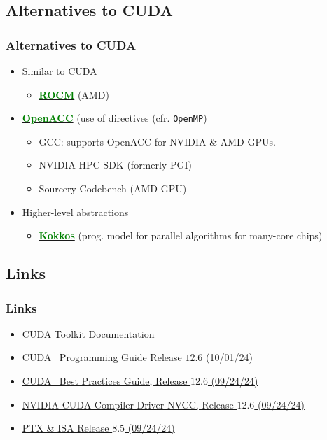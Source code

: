 \subsection{Alternatives to CUDA}
\begin{frame}
   \frametitle{Alternatives to CUDA}
      \begin{itemize}
         \item Similar to CUDA
   	    \begin{itemize}
	       \item \href{https://www.amd.com/en/products/software/rocm.html}{\textbf{\textcolor{green}{ROCM}}} (AMD)
  	    \end{itemize} 
          \item \href{https://www.openacc.org/}{\textbf{\textcolor{green}{OpenACC}}} (use of directives (cfr. \texttt{OpenMP})
             \begin{itemize}
                \item GCC: supports OpenACC for NVIDIA  \& AMD GPUs. 
                \item NVIDIA HPC SDK (formerly PGI)
                \item Sourcery Codebench (AMD GPU) %
	     \end{itemize}
          \item Higher-level abstractions
             \begin{itemize}
		\item \href{https://www.kokkos.org/about/core/}{\textbf{\textcolor{green}{Kokkos}}} (prog. model for parallel algorithms for many-core chips)
             \end{itemize}
      \end{itemize}
\end{frame}	

\subsection{Links}
\begin{frame}
   \frametitle{Links}
      \begin{itemize}
         \item \href{https://docs.nvidia.com/cuda/index.html}{CUDA Toolkit Documentation}
	 \item \href{https://docs.nvidia.com/cuda/cuda-c-programming-guide/index.html}{CUDA \CC\, Programming Guide Release $12.6$ 
		 (10/01/24)}
	 \item \href{https://docs.nvidia.com/cuda/cuda-c-best-practices-guide/index.html}{CUDA \CC\, Best Practices Guide, Release $12.6$ (09/24/24)}	      
         \item \href{https://docs.nvidia.com/cuda/cuda-compiler-driver-nvcc/}{NVIDIA CUDA Compiler Driver NVCC, Release $12.6$ (09/24/24)}		 
         \item \href{https://docs.nvidia.com/cuda/parallel-thread-execution/}{PTX \& ISA Release $8.5$ (09/24/24)}	
		 
      \end{itemize}		      
\end{frame}	

